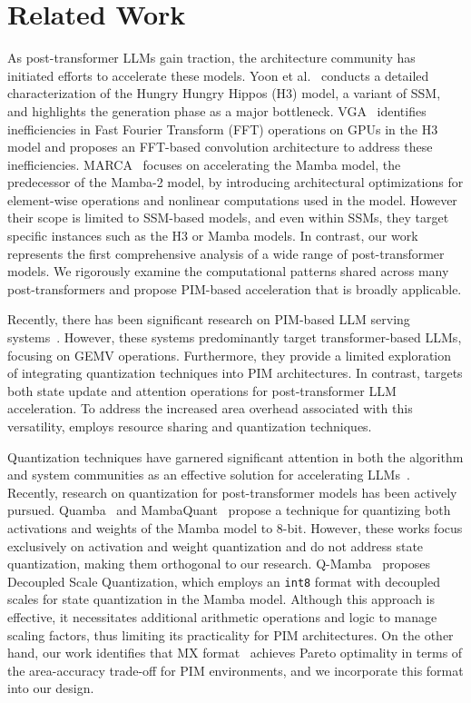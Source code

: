 \section{Related Work}
%
%
As post-transformer LLMs gain traction, the architecture community
has initiated efforts to accelerate these models.
%
Yoon et al.~\cite{yoon24analysish3} conducts a detailed
characterization of the Hungry Hungry Hippos (H3) model, a variant of
SSM, and highlights the generation phase as a major bottleneck.
%
VGA~\cite{vga} identifies inefficiencies in Fast Fourier Transform
(FFT) operations on GPUs in the H3 model and proposes an FFT-based
convolution architecture to address these inefficiencies.
%
MARCA~\cite{marca} focuses on accelerating the Mamba model, the
predecessor of the Mamba-2 model, by introducing architectural
optimizations for element-wise operations and nonlinear computations
used in the model.
%
However their scope is limited to SSM-based models, and even within
SSMs, they target specific instances such as the H3 or Mamba models.
%
In contrast, our work represents the first comprehensive analysis of
a wide range of post-transformer models.
%
We rigorously examine the computational patterns shared across many
post-transformers and propose PIM-based acceleration that is broadly applicable.

%
%
Recently, there has been significant research on PIM-based LLM
serving
systems~\cite{alsop2024inclusivepimhardwaresoftwarecodesignbroad,
  hyun2024pathfinding, heo2024neupims, ianus, psyncpim, llmservingsim,
newton, hbm_pim}.
%
However, these systems predominantly target transformer-based LLMs,
focusing on GEMV operations.
%
Furthermore, they provide a limited exploration of integrating
quantization techniques into PIM architectures.
%
In contrast, \sysname{} targets both state update and attention
operations for post-transformer LLM acceleration.
%
To address the increased area overhead associated with this
versatility, \sysname{} employs resource sharing and quantization techniques.

%
%
Quantization techniques have garnered significant attention in both
the algorithm and system communities as an effective solution for
accelerating LLMs~\cite{xiao2023smoothquant, hooper2024kvquant, monkey, atom}.
%
Recently, research on quantization for post-transformer models has
been actively pursued.
%
Quamba~\cite{quamba} and MambaQuant~\cite{mambaquant} propose a
technique for quantizing both activations and weights of the Mamba
model to 8-bit.
%
However, these works focus exclusively on activation and weight
quantization and do not address state quantization, making them
orthogonal to our research.
%
Q-Mamba~\cite{qmamba} proposes Decoupled Scale Quantization, which
employs an \texttt{int8} format with decoupled scales for state
quantization in the Mamba model.
%
Although this approach is effective, it necessitates additional
arithmetic operations and logic to manage scaling factors, thus
limiting its practicality for PIM architectures.
%
On the other hand, our work identifies that MX
format~\cite{rouhani2023shared} achieves Pareto optimality in terms
of the area-accuracy trade-off for PIM environments, and we
incorporate this format into our design.
%
